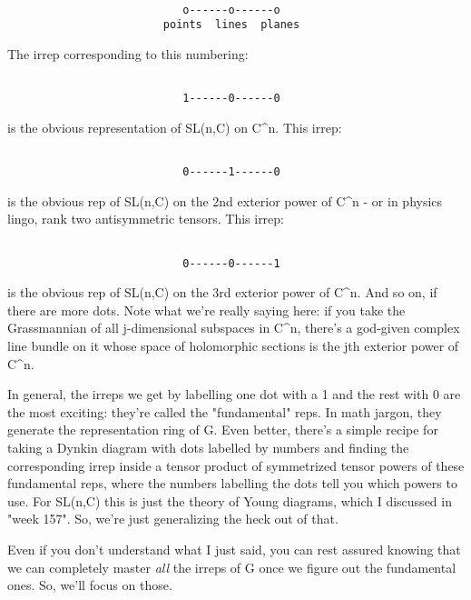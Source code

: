 \begin{verbatim}

                           o------o------o
                        points  lines  planes       
\end{verbatim}
    
The irrep corresponding to this numbering:


\begin{verbatim}

                           1------0------0
\end{verbatim}
    
is the obvious representation of SL(n,C) on C^{n}.  This irrep:


\begin{verbatim}

                           0------1------0
\end{verbatim}
    
is the obvious rep of SL(n,C) on the 2nd exterior power of C^{n} - 
or in physics lingo, rank two antisymmetric tensors.  This irrep:


\begin{verbatim}

                           0------0------1
\end{verbatim}
    
is the obvious rep of SL(n,C) on the 3rd exterior power of C^{n}.
And so on, if there are more dots.   Note what we're really saying 
here: if you take the Grassmannian of all j-dimensional subspaces
in C^{n}, there's a god-given complex line bundle on it whose space
of holomorphic sections is the jth exterior power of C^{n}.  

In general, the irreps we get by labelling one dot with a 1 and the
rest with 0 are the most exciting: they're called the "fundamental"
reps.  In math jargon, they generate the representation ring of G.  Even
better, there's a simple recipe for taking a Dynkin diagram with dots
labelled by numbers and finding the corresponding irrep inside a
tensor product of symmetrized tensor powers of these fundamental reps,
where the numbers labelling the dots tell you which powers to use.  
For SL(n,C) this is just the theory of Young diagrams, which I discussed 
in "week 157".  So, we're just generalizing the heck out of that.

Even if you don't understand what I just said, you can rest assured
knowing that we can completely master \emph{all} the irreps of G once we
figure out the fundamental ones.  So, we'll focus on those.

